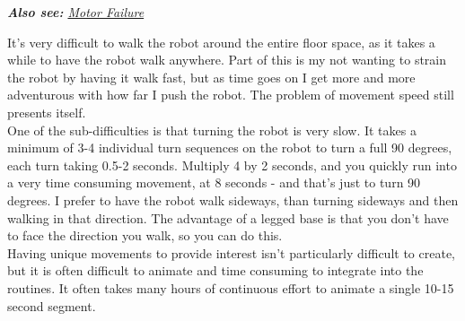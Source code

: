             \textit{\textbf{Also see: }\hyperref[motor_failure]{Motor Failure}}
            
            It's very difficult to walk the robot around the entire floor space, as it takes a while to have the robot walk anywhere. Part of this is my not wanting to strain the robot by having it walk fast, but as time goes on I get more and more adventurous with how far I push the robot. The problem of movement speed still presents itself.\\
            
            One of the sub-difficulties is that turning the robot is very slow. It takes a minimum of 3-4 individual turn sequences on the robot to turn a full 90 degrees, each turn taking 0.5-2 seconds. Multiply 4 by 2 seconds, and you quickly run into a very time consuming movement, at 8 seconds - and that's just to turn 90 degrees. I prefer to have the robot walk sideways, than turning sideways and then walking in that direction. The advantage of a legged base is that you don't have to face the direction you walk, so you can do this.\\
            
            Having unique movements to provide interest isn't particularly difficult to create, but it is often difficult to animate and time consuming to integrate into the routines. It often takes many hours of continuous effort to animate a single 10-15 second segment.\\
            
            

        
        
    	